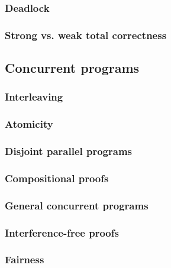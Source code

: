 \documentclass[12pt, a4paper]{book}
\begin{document}
  \subsubsection{Deadlock}
  \label{subs:Deadlock}
  \subsubsection{Strong vs. weak total correctness}
  \label{subs:Strong vs. weak total correctness}
  \subsection{Concurrent programs}
  \label{sub:Concurrent programs}
  \subsubsection{Interleaving}
  \label{subs:Interleaving}
  \subsubsection{Atomicity}
  \label{subs:Atomicity}
  \subsubsection{Disjoint parallel programs}
  \label{subs:Disjoint parallel programs}
  \subsubsection{Compositional proofs}
  \label{subs:Compositional proofs}
  \subsubsection{General concurrent programs}
  \label{subs:General concurrent programs}
  \subsubsection{Interference-free proofs}
  \label{subs:Interference-free proofs}
  \subsubsection{Fairness}
  \label{subs:Fairness}


\end{document}
